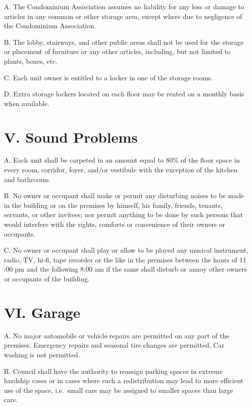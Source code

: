 \documentclass[
  14pt,
]{book}
\begin{document}
A. The Condominium Association assumes no liability for any loss or damage to articles in any common or other storage area, except where due to negligence of the Condominium Association.

B. The lobby, stairways, and other public areas shall not be used for the storage or placement of furniture or any other articles, including, but not limited to plants, boxes, etc.

C. Each unit owner is entitled to a locker in one of the storage rooms.

D. Extra storage lockers located on each floor may be rented on a monthly basis when available.

\hypertarget{v.-sound-problems}{%
\section*{V. Sound Problems}\label{v.-sound-problems}}

A. Each unit shall be carpeted in an amount equal to 80\% of the floor space in every room, corridor, foyer, and/or vestibule with the exception of the kitchen and bathrooms.

B. No owner or occupant shall make or permit any disturbing noises to be made in the building or on the premises by himself, his family, friends, tenants, servants, or other invitees; nor permit anything to be done by such persons that would interfere with the rights, comforts or convenience of their owners or occupants.

C. No owner or occupant shall play or allow to be played any musical instrument, radio, TV, hi-fi, tape recorder or the like in the premises between the hours of 11 :00 pm and the following 8:00 am if the same shall disturb or annoy other owners or occupants of the building.

\hypertarget{vi.-garage}{%
\section*{VI. Garage}\label{vi.-garage}}

A. No major automobile or vehicle repairs are permitted on any part of the premises. Emergency repairs and seasonal tire changes are permitted. Car washing is not permitted.

B. Council shall have the authority to reassign parking spaces in extreme hardship cases or in cases where such a redistribution may lead to more efficient use of the space, i.e.~small cars may be assigned to smaller spaces than large cars.
\end{document}
